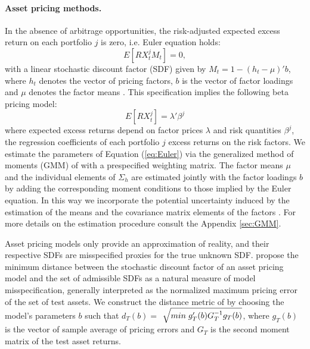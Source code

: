 \paragraph{Asset pricing methods.}
In the absence of arbitrage opportunities, the risk-adjusted expected excess return on each portfolio $j$ is zero, i.e. Euler equation holds:
\begin{equation} \label{eq:Euler}
	E[RX_{t}^j M_{t}]=0,
\end{equation}
with a linear stochastic discount factor (SDF) given by $M_{t}=1-(h_{t}-\mu)'b$, where $h_t$ denotes the vector of pricing factors, $b$ is the vector of factor loadings and $\mu$ denotes the factor means \citep[e.g.,][]{cochrane2005}. This specification implies the following beta pricing model:
\begin{equation} \label{eq:beta_model_UNC_CAR}
	E[RX_t^j]=\lambda'\beta^j
\end{equation}
where expected excess returns depend on factor prices $\lambda$ and risk quantities $\beta^j$, the regression coefficients of each portfolio $j$ excess returns on the risk factors. %
We estimate the parameters of Equation (\ref{eq:Euler}) via the generalized method of moments (GMM) of \citet{hansen1982} with a prespecified weighting matrix. The factor means $\mu$ and the individual elements of $\Sigma_h$ are estimated jointly with the factor loadings $b$ by adding the corresponding moment conditions to those implied by the Euler equation. In this way we incorporate the potential uncertainty induced by the estimation of the means and the covariance matrix elements of the factors \citep[e.g.,][]{burnside2011,menkhoff_etal2012}. For more details on the estimation procedure consult the Appendix \ref{sec:GMM}.

Asset pricing models only provide an approximation of reality, and their respective SDFs are misspecified proxies for the true unknown SDF. \citet{hansen/jagannathan:97} propose the minimum distance between the stochastic discount factor of an asset pricing model and the set of admissible SDFs as a natural measure of model misspecification, generally interpreted as the normalized maximum pricing error of the set of test assets. We construct the distance metric of \citet{hansen/jagannathan:97} by choosing the model's parameters $b$ such that $d_T (b) = $ $\sqrt{ min \hspace{0.1cm} g_T'(b)G_T^{-1}g_T(b)}$, where $g_T(b)$ is the vector of sample average of pricing errors and $G_T$ is the second moment matrix of the test asset returns.

